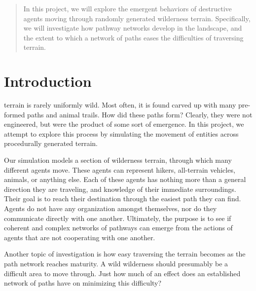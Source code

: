 \documentclass[conference]{IEEEtran}
\begin{document}
\begin{abstract}
In this project, we will explore the emergent behaviors of destructive agents moving through randomly generated wilderness terrain. Specifically, we will investigate how pathway networks develop in the landscape, and the extent to which a network of paths eases the difficulties of traversing terrain.
\end{abstract}





%
\IEEEpeerreviewmaketitle



\section{Introduction}

 terrain is rarely uniformly wild. Most often, it is found carved up with many pre-formed paths and animal trails. How did these paths form? Clearly, they were not engineered, but were the product of some sort of emergence. In this project, we attempt to explore this process by simulating the movement of entities across procedurally generated terrain.
	
	Our simulation models a section of wilderness terrain, through which many different agents move. These agents can represent hikers, all-terrain vehicles, animals, or anything else. Each of these agents has nothing more than a general direction they are traveling, and knowledge of their immediate surroundings. Their goal is to reach their destination through the easiest path they can find. Agents do not have any organization amongst themselves, nor do they communicate directly with one another. Ultimately, the purpose is to see if coherent and complex networks of pathways can emerge from the actions of agents that are not cooperating with one another.
	
	Another topic of investigation is how easy traversing the terrain becomes as the path network reaches maturity. A wild wilderness should 	presumably be a difficult area to move through. Just how much of an effect does an established network of paths have on minimizing this difficulty?
	
\end{document}
